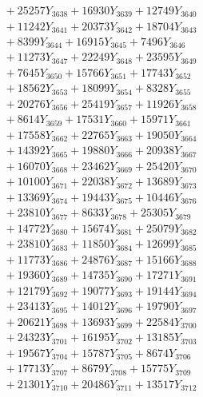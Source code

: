 \documentclass[a4paper,10pt]{article}
\begin{document}
{\begin{align}
&\;  + 25257 Y_{3638} + 16930 Y_{3639} + 12749 Y_{3640} \\[0.3ex]
&\;  + 11242 Y_{3641} + 20373 Y_{3642} + 18704 Y_{3643} \\[0.3ex]
&\;  + 8399 Y_{3644} + 16915 Y_{3645} + 7496 Y_{3646} \\[0.3ex]
&\;  + 11273 Y_{3647} + 22249 Y_{3648} + 23595 Y_{3649} \\[0.3ex]
&\;  + 7645 Y_{3650} + 15766 Y_{3651} + 17743 Y_{3652} \\[0.3ex]
&\;  + 18562 Y_{3653} + 18099 Y_{3654} + 8328 Y_{3655} \\[0.3ex]
&\;  + 20276 Y_{3656} + 25419 Y_{3657} + 11926 Y_{3658} \\[0.5ex]\allowbreak
&\;  + 8614 Y_{3659} + 17531 Y_{3660} + 15971 Y_{3661} \\[0.3ex]
&\;  + 17558 Y_{3662} + 22765 Y_{3663} + 19050 Y_{3664} \\[0.3ex]
&\;  + 14392 Y_{3665} + 19880 Y_{3666} + 20938 Y_{3667} \\[0.3ex]
&\;  + 16070 Y_{3668} + 23462 Y_{3669} + 25420 Y_{3670} \\[0.3ex]
&\;  + 10100 Y_{3671} + 22038 Y_{3672} + 13689 Y_{3673} \\[0.3ex]
&\;  + 13369 Y_{3674} + 19443 Y_{3675} + 10446 Y_{3676} \\[0.3ex]
&\;  + 23810 Y_{3677} + 8633 Y_{3678} + 25305 Y_{3679} \\[0.3ex]
&\;  + 14772 Y_{3680} + 15674 Y_{3681} + 25079 Y_{3682} \\[0.3ex]
&\;  + 23810 Y_{3683} + 11850 Y_{3684} + 12699 Y_{3685} \\[0.3ex]
&\;  + 11773 Y_{3686} + 24876 Y_{3687} + 15166 Y_{3688} \\[0.5ex]\allowbreak
&\;  + 19360 Y_{3689} + 14735 Y_{3690} + 17271 Y_{3691} \\[0.3ex]
&\;  + 12179 Y_{3692} + 19077 Y_{3693} + 19144 Y_{3694} \\[0.3ex]
&\;  + 23413 Y_{3695} + 14012 Y_{3696} + 19790 Y_{3697} \\[0.3ex]
&\;  + 20621 Y_{3698} + 13693 Y_{3699} + 22584 Y_{3700} \\[0.3ex]
&\;  + 24323 Y_{3701} + 16195 Y_{3702} + 13185 Y_{3703} \\[0.3ex]
&\;  + 19567 Y_{3704} + 15787 Y_{3705} + 8674 Y_{3706} \\[0.3ex]
&\;  + 17713 Y_{3707} + 8679 Y_{3708} + 15775 Y_{3709} \\[0.3ex]
&\;  + 21301 Y_{3710} + 20486 Y_{3711} + 13517 Y_{3712} \\[0.3ex]

\end{align}}
\end{document}
